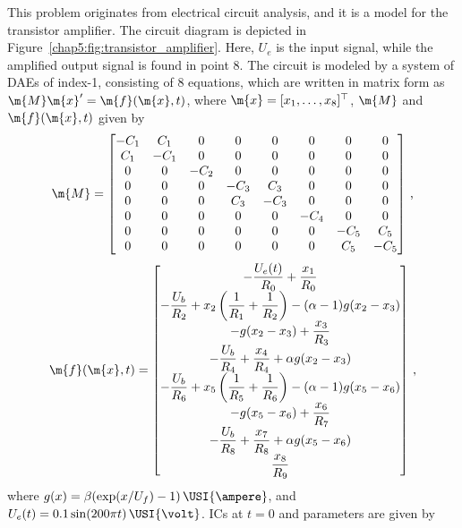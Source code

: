 This problem originates from electrical circuit analysis, and it is a model for the transistor amplifier. The circuit diagram is depicted in Figure~\ref{chap5:fig:transistor_amplifier}. Here, $U_e$ is the input signal, while the amplified output signal is found in point 8. The circuit is modeled by a system of \acp{DAE} of index-1, consisting of 8 equations, which are written in matrix form as $\m{M}\m{x}^\prime = \m{f}(\m{x},t)$, where $\m{x} = [x_1, \dots, x_8]^\top$, $\m{M}$ and $\m{f}(\m{x},t)$ given by
%
\begin{equation*}
  \m{M} = \begin{bmatrix}
    -C_1 & C_1 & 0 & 0 & 0 & 0 & 0 & 0 \\
    C_1 & -C_1 & 0 & 0 & 0 & 0 & 0 & 0 \\
    0 & 0 & -C_2 & 0 & 0 & 0 & 0 & 0 \\
    0 & 0 & 0 & -C_3 & C_3 & 0 & 0 & 0 \\
    0 & 0 & 0 & C_3 & -C_3 & 0 & 0 & 0 \\
    0 & 0 & 0 & 0 & 0 & -C_4 & 0 & 0 \\
    0 & 0 & 0 & 0 & 0 & 0 & -C_5 & C_5 \\
    0 & 0 & 0 & 0 & 0 & 0 & C_5 & -C_5
  \end{bmatrix} \, \text{,}
\end{equation*}
%
\begin{equation*}
  \m{f}(\m{x},t) = \begin{bmatrix}
    -\dfrac{U_e(t)}{R_0} + \dfrac{x_1}{R_0} \\
    -\dfrac{U_b}{R_2} + x_2\left(\dfrac{1}{R_1}+\dfrac{1}{R_2}\right) - (\alpha-1)g(x_2-x_3) \\
    -g(x_2-x_3)+\dfrac{x_3}{R_3} \\
    -\dfrac{U_b}{R_4} + \dfrac{x_4}{R_4} + \alpha g(x_2-x_3) \\
    -\dfrac{U_b}{R_6} + x_5\left(\dfrac{1}{R_5} + \dfrac{1}{R_6}\right)-(\alpha-1) g(x_5-x_6) \\
    -g(x_5-x_6) + \dfrac{x_6}{R_7} \\
    -\dfrac{U_b}{R_8} + \dfrac{x_7}{R_8} + \alpha g(x_5-x_6) \\
    \dfrac{x_8}{R_9}
  \end{bmatrix} \, \text{,}
\end{equation*}
%
where $g(x) = \beta(\exp(x/U_f) - 1)\,\USI{\ampere}$, and $U_e(t) = 0.1\sin(200 \pi t)\,\USI{\volt}$. \acp{IC} at $t = 0$ and parameters are given by
%
